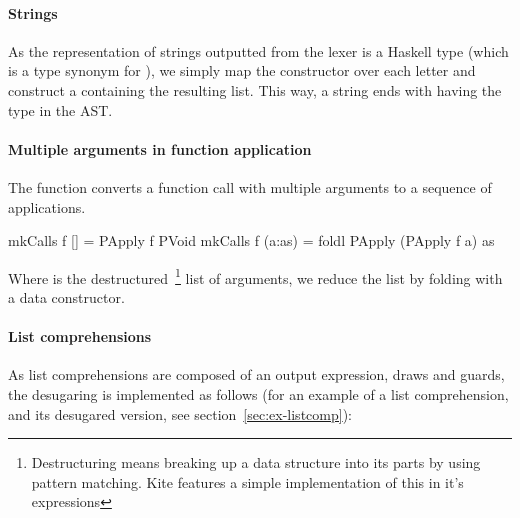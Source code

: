 \paragraph{Strings}
As the representation of strings outputted from the lexer is a Haskell  type (which is a type synonym for \code{[Char]}), we simply map the  constructor over each letter and construct a  containing the resulting list. This way, a string ends with having the type  in the AST.

\paragraph{Multiple arguments in function application}
The  function converts a function call with multiple arguments to a sequence of applications.

\begin{haskell}
mkCalls f [] = PApply f PVoid
mkCalls f (a:as) = foldl PApply (PApply f a) as
\end{haskell}

Where  is the destructured~\footnote{Destructuring means breaking up a data structure into its parts by using pattern matching. Kite features a simple implementation of this in it's  expressions} list of arguments, we reduce the list by folding with a  data constructor.

\paragraph{List comprehensions}
As list comprehensions are composed of an output expression, draws and guards, the desugaring is implemented as follows (for an example of a list comprehension, and its desugared version, see section~\ref{sec:ex-listcomp}):

